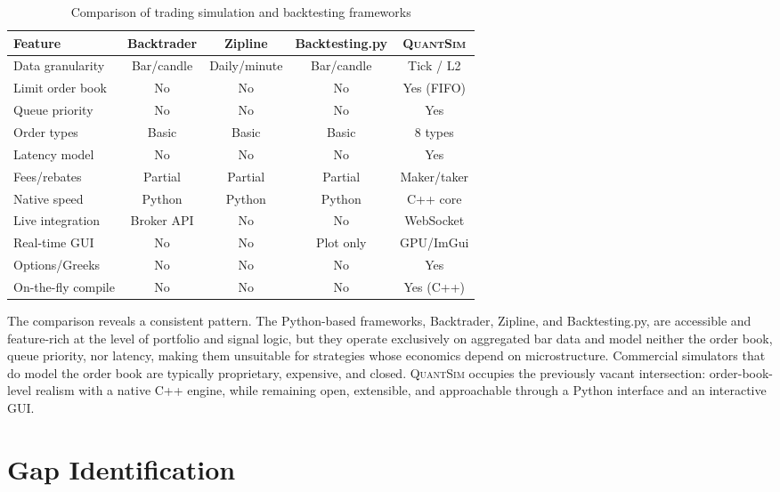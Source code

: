 \documentclass[12pt,oneside,a4paper]{report}
\newcommand{\quantsim}{\textsc{QuantSim}}
\begin{document}
\begin{table}[H]
\centering
\caption{Comparison of trading simulation and backtesting frameworks}
\label{tab:comparison}
\small
\begin{tabular}{p{1.5in}cccc}
\toprule
\textbf{Feature} & \textbf{Backtrader} & \textbf{Zipline} & \textbf{Backtesting.py} & \textbf{\quantsim{}} \\
\midrule
Data granularity & Bar/candle & Daily/minute & Bar/candle & Tick / L2 \\
Limit order book & No & No & No & Yes (FIFO) \\
Queue priority & No & No & No & Yes \\
Order types & Basic & Basic & Basic & 8 types \\
Latency model & No & No & No & Yes \\
Fees/rebates & Partial & Partial & Partial & Maker/taker \\
Native speed & Python & Python & Python & C++ core \\
Live integration & Broker API & No & No & WebSocket \\
Real-time GUI & No & No & Plot only & GPU/ImGui \\
Options/Greeks & No & No & No & Yes \\
On-the-fly compile & No & No & No & Yes (C++) \\
\bottomrule
\end{tabular}
\end{table}

The comparison reveals a consistent pattern. The Python-based frameworks, Backtrader, Zipline, and Backtesting.py, are accessible and feature-rich at the level of portfolio and signal logic, but they operate exclusively on aggregated bar data and model neither the order book, queue priority, nor latency, making them unsuitable for strategies whose economics depend on microstructure. Commercial simulators that do model the order book are typically proprietary, expensive, and closed. \quantsim{} occupies the previously vacant intersection: order-book-level realism with a native C++ engine, while remaining open, extensible, and approachable through a Python interface and an interactive GUI.

\section{Gap Identification}
\label{sec:gap}
\end{document}
